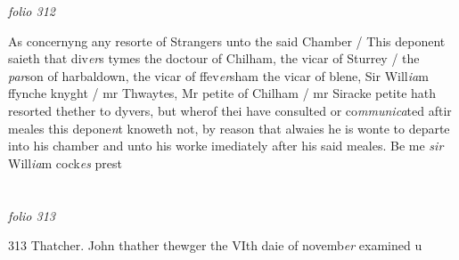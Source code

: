 \documentclass[12pt, a4paper]{book}
\begin{document}
\dotfill
					

\textit{folio 312}


As concernyng any resorte of Strangers unto the said Chamber / This deponent saieth that div\textit{er}s tymes the doctour of Chilham, the vicar of Sturrey / the  \textit{par}son of harbaldown, the vicar of ffev\textit{er}sham the  vicar of blene, Sir Will\textit{ia}m ffynche knyght / mr  Thwaytes, Mr petite of Chilham / mr Siracke petite  hath resorted thether to dyvers, but wherof thei have consulted or co\textit{mmunica}ted aftir meales this depone\textit{n}t  knoweth not, by reason that alwaies he is wonte to departe into his chamber and unto his worke imediately after his said 
			meales.  Be me \textit{sir} Will\textit{ia}m cock\textit{es} prest

\dotfill
					  \section*{}  \subsection*{}

\textit{folio 313}



{\color{Mahogany}313} Thatcher.  John thather thewger the VIth daie of novemb\textit{er} examined u
                  
\end{document}

